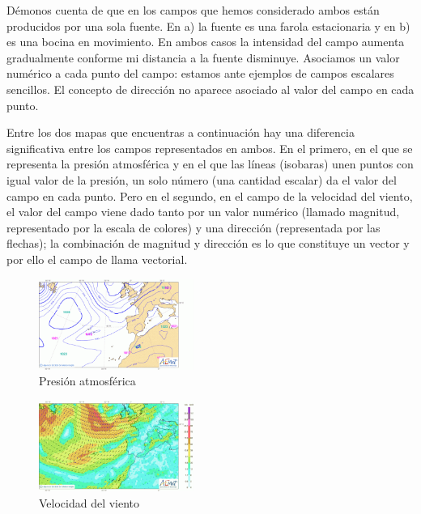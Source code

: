 Démonos cuenta de que en los campos que hemos considerado ambos están producidos por una sola fuente. En a) la fuente es una farola estacionaria y en b) es una bocina en movimiento. En ambos casos la intensidad del campo aumenta gradualmente conforme mi distancia a la fuente disminuye. Asociamos un valor numérico a cada punto del campo: estamos ante ejemplos de campos escalares sencillos. El concepto de dirección no aparece asociado al valor del campo en cada punto.

Entre los dos mapas que encuentras a continuación hay una diferencia significativa entre los campos representados en ambos. En el primero, en el que se representa la presión atmosférica y en el que las líneas (isobaras) unen puntos con igual valor de la presión, un solo número (una cantidad escalar) da el valor del campo en cada punto. Pero en el segundo, en el campo de la velocidad del viento, el valor del campo viene dado tanto por un valor numérico (llamado magnitud, representado por la escala de colores) y una dirección (representada por las flechas); la combinación de magnitud y dirección es lo que constituye un vector y por ello el campo de llama vectorial.
	
	
	\begin{multicols}{2}
	\begin{figure}[H]
	\centering
	\includegraphics[width=0.45\textwidth]{imagenes/imagenescv/ExperientiaDocet03.png}
	\caption*{Presión atmosférica}
	\end{figure}
	\begin{figure}[H]
	\centering
	\includegraphics[width=0.45\textwidth]{imagenes/imagenescv/ExperientiaDocet04.png}
	\caption*{Velocidad del viento}
	\end{figure}
	\end{multicols}



